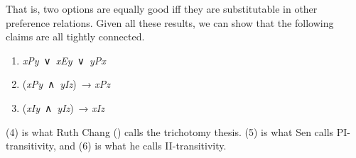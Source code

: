 \documentclass[
  11pt,
  letterpaper,
  DIV=11,
  numbers=noendperiod,
  twoside]{scrartcl}
\providecommand{\tightlist}{%
  \setlength{\itemsep}{0pt}\setlength{\parskip}{0pt}}
\begin{document}
That is, two options are equally good iff they are substitutable in
other preference relations. Given all these results, we can show that
the following claims are all tightly connected.

\begin{enumerate}
\def\labelenumi{(\arabic{enumi})}
\setcounter{enumi}{3}
\tightlist
\item
  \emph{xPy}~∨~\emph{xEy}~∨~\emph{yPx}
\item
  (\emph{xPy}~∧~\emph{yIz})~→ \emph{xPz}
\item
  (\emph{xIy}~∧~\emph{yIz})~→ \emph{xIz}
\end{enumerate}

(4) is what Ruth Chang () calls the
trichotomy thesis. (5) is what Sen calls PI-transitivity, and (6) is
what he calls II-transitivity.
\end{document}
